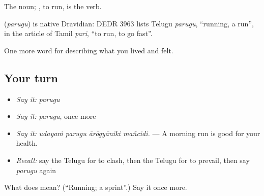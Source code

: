 The noun; , to run, is the verb.

\begin{cousinweb}
\textbf{} (\emph{parugu}) is native Dravidian: DEDR 3963 lists Telugu \emph{parugu}, \textquotedblleft{}running, a run\textquotedblright{}, in the article of Tamil \emph{pari}, \textquotedblleft{}to run, to go fast\textquotedblright{}.
\end{cousinweb}

\begin{grammarlens}[title={What you've built}]
One more word for describing what you lived and felt.
\end{grammarlens}

\subsection*{Your turn}
\begin{itemize}
\raggedright
  \item \emph{Say it:} \emph{parugu}
  \item \emph{Say it:} \emph{parugu}, once more
  \item \emph{Say it:} \emph{udayaṁ parugu ārōgyāniki mañcidi.} — A morning run is good for your health.
  \item \emph{Recall:} say the Telugu for to clash, then the Telugu for to prevail, then say \emph{parugu} again
\end{itemize}

\begin{tcolorbox}[breakable,colback=teal!4,colframe=teal!35!black,title={Before you move on}]
What does  mean? (\textquotedblleft{}Running; a sprint\textquotedblright{}.) Say it once more.
\end{tcolorbox}
